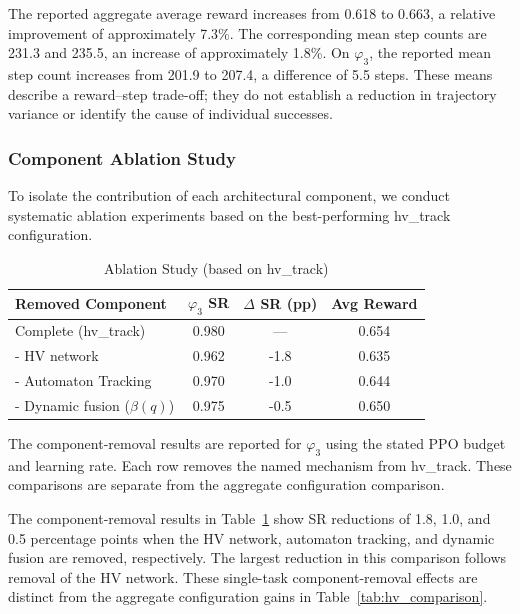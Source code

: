 \documentclass[journal]{IEEEtran}
\begin{document}
The reported aggregate average reward increases from 0.618 to 0.663, a relative improvement of approximately 7.3\%. The corresponding mean step counts are 231.3 and 235.5, an increase of approximately 1.8\%. On $\varphi_3$, the reported mean step count increases from 201.9 to 207.4, a difference of 5.5 steps. These means describe a reward--step trade-off; they do not establish a reduction in trajectory variance or identify the cause of individual successes.

\subsubsection{Component Ablation Study}
\label{app:ablation}

To isolate the contribution of each architectural component, we conduct systematic ablation experiments based on the best-performing hv\_track configuration.

\begin{table}[h]
\centering
\caption{Ablation Study (based on hv\_track)}
\label{tab:ablation}
\begin{tabular}{@{}lccc@{}}
	\toprule
	\textbf{Removed Component} & \textbf{$\varphi_3$ SR} & \textbf{$\Delta$ SR (pp)} & \textbf{Avg Reward} \\ \midrule
Complete (hv\_track) & 0.980 & --- & 0.654 \\
- HV network & 0.962 & -1.8 & 0.635 \\
- Automaton Tracking & 0.970 & -1.0 & 0.644 \\
- Dynamic fusion ($\beta(q)$) & 0.975 & -0.5 & 0.650 \\ \bottomrule
\end{tabular}
\end{table}

The component-removal results are reported for $\varphi_3$ using the stated PPO budget and learning rate. Each row removes the named mechanism from hv\_track. These comparisons are separate from the aggregate configuration comparison.

The component-removal results in Table~\ref{tab:ablation} show SR reductions of 1.8, 1.0, and 0.5 percentage points when the HV network, automaton tracking, and dynamic fusion are removed, respectively. The largest reduction in this comparison follows removal of the HV network. These single-task component-removal effects are distinct from the aggregate configuration gains in Table~\ref{tab:hv_comparison}.
\end{document}
